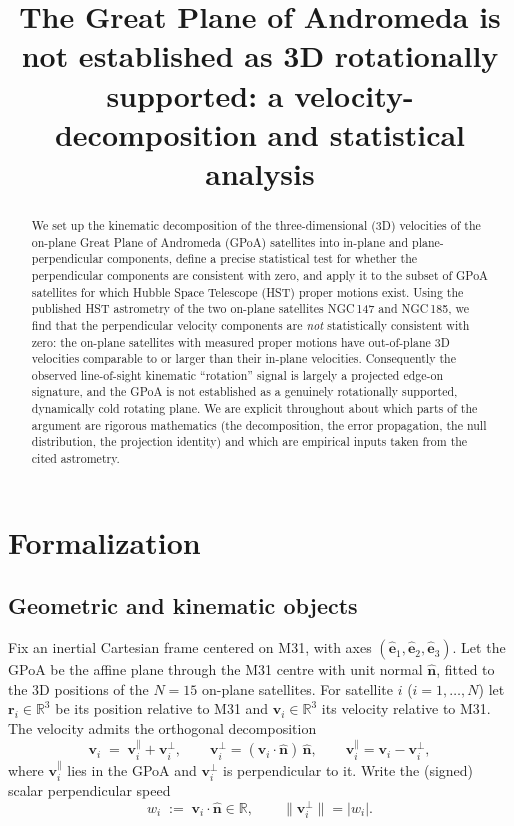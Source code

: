 \documentclass{amsart}
\theoremstyle{definition}
\begin{document}
\title{The Great Plane of Andromeda is not established as 3D rotationally
supported: a velocity-decomposition and statistical analysis}
\maketitle

\begin{abstract}
We set up the kinematic decomposition of the three-dimensional (3D)
velocities of the on-plane Great Plane of Andromeda (GPoA) satellites into
in-plane and plane-perpendicular components, define a precise statistical
test for whether the perpendicular components are consistent with zero, and
apply it to the subset of GPoA satellites for which Hubble Space Telescope
(HST) proper motions exist. Using the published HST astrometry of the two
on-plane satellites NGC\,147 and NGC\,185, we find that the perpendicular
velocity components are \emph{not} statistically consistent with zero: the
on-plane satellites with measured proper motions have out-of-plane 3D
velocities comparable to or larger than their in-plane velocities.
Consequently the observed line-of-sight kinematic ``rotation'' signal is
largely a projected edge-on signature, and the GPoA is not established as a
genuinely rotationally supported, dynamically cold rotating plane. We are
explicit throughout about which parts of the argument are rigorous
mathematics (the decomposition, the error propagation, the null
distribution, the projection identity) and which are empirical inputs taken
from the cited astrometry.
\end{abstract}

\section{Formalization}

\subsection{Geometric and kinematic objects}
Fix an inertial Cartesian frame centered on M31, with axes
$(\hat{\bm e}_1,\hat{\bm e}_2,\hat{\bm e}_3)$. Let the GPoA be the affine
plane through the M31 centre with unit normal $\hat{\bm n}$, fitted to the
3D positions of the $N=15$ on-plane satellites. For satellite $i$
($i=1,\dots,N$) let $\bm r_i\in\mathbb R^3$ be its position relative to M31
and $\bm v_i\in\mathbb R^3$ its velocity relative to M31. The velocity admits
the orthogonal decomposition
\begin{equation}\label{eq:decomp}
  \bm v_i \;=\; \bm v_i^{\parallel} + \bm v_i^{\perp},
  \qquad
  \bm v_i^{\perp} = (\bm v_i\cdot\hat{\bm n})\,\hat{\bm n},
  \qquad
  \bm v_i^{\parallel} = \bm v_i - \bm v_i^{\perp},
\end{equation}
where $\bm v_i^{\parallel}$ lies in the GPoA and $\bm v_i^{\perp}$ is
perpendicular to it. Write the (signed) scalar perpendicular speed
\begin{equation}\label{eq:wperp}
  w_i \;:=\; \bm v_i\cdot\hat{\bm n} \in\mathbb R,
  \qquad
  \|\bm v_i^{\perp}\| = |w_i|.
\end{equation}
\end{document}
